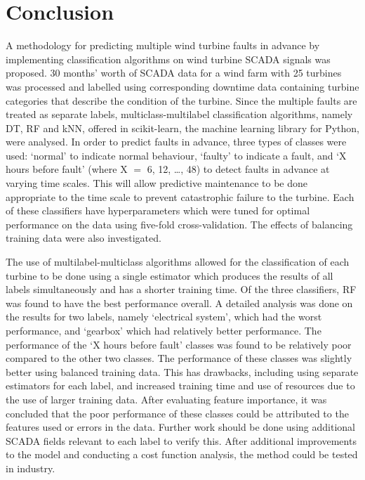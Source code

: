 \chapter{Conclusion}\label{c5}

A methodology for predicting multiple wind turbine faults in advance by implementing classification algorithms on wind turbine SCADA signals was proposed. 30 months' worth of SCADA data for a wind farm with 25 turbines was processed and labelled using corresponding downtime data containing turbine categories that describe the condition of the turbine. Since the multiple faults are treated as separate labels, multiclass-multilabel classification algorithms, namely DT, RF and kNN, offered in scikit-learn, the machine learning library for Python, were analysed. In order to predict faults in advance, three types of classes were used: `normal' to indicate normal behaviour, `faulty' to indicate a fault, and `X hours before fault' (where X $=$ 6, 12, \dots, 48) to detect faults in advance at varying time scales. This will allow predictive maintenance to be done appropriate to the time scale to prevent catastrophic failure to the turbine. Each of these classifiers have hyperparameters which were tuned for optimal performance on the data using five-fold cross-validation. The effects of balancing training data were also investigated.

The use of multilabel-multiclass algorithms allowed for the classification of each turbine to be done using a single estimator which produces the results of all labels simultaneously and has a shorter training time. Of the three classifiers, RF was found to have the best performance overall. A detailed analysis was done on the results for two labels, namely `electrical system', which had the worst performance, and `gearbox' which had relatively better performance. The performance of the `X hours before fault' classes was found to be relatively poor compared to the other two classes. The performance of these classes was slightly better using balanced training data. This has drawbacks, including using separate estimators for each label, and increased training time and use of resources due to the use of larger training data. After evaluating feature importance, it was concluded that the poor performance of these classes could be attributed to the features used or errors in the data. Further work should be done using additional SCADA fields relevant to each label to verify this. After additional improvements to the model and conducting a cost function analysis, the method could be tested in industry.
